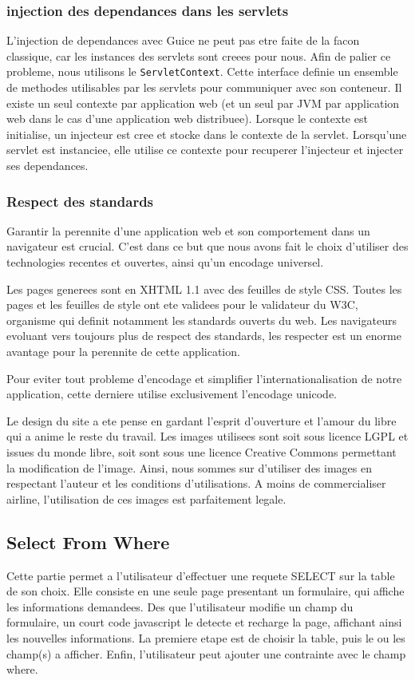 \subsubsection{injection des dependances dans les servlets}
L'injection de dependances avec Guice ne peut pas etre faite de la facon classique, car les instances des servlets sont creees pour nous. Afin de palier ce probleme, nous utilisons le \verb|ServletContext|. Cette  interface definie un ensemble de methodes utilisables par les servlets pour communiquer avec son conteneur. Il existe un seul contexte par application web (et un seul par JVM par application web dans le cas d'une application web distribuee). Lorsque le contexte est initialise, un injecteur est cree et stocke dans le contexte de la servlet. Lorsqu'une servlet est instanciee, elle utilise ce contexte pour recuperer l'injecteur et injecter ses dependances.

\subsubsection{Respect des standards}
Garantir la perennite d'une application web et son comportement dans un navigateur est crucial. C'est dans ce but que nous avons fait le choix d'utiliser des technologies recentes et ouvertes, ainsi qu'un encodage universel.

Les pages generees sont en XHTML 1.1 avec des feuilles de style CSS. Toutes les pages et les feuilles de style ont ete validees pour le validateur du W3C, organisme qui definit notamment les standards ouverts du web. Les navigateurs evoluant vers toujours plus de respect des standards, les respecter est un enorme avantage pour la perennite de cette application.

Pour eviter tout probleme d'encodage et simplifier l'internationalisation de notre application, cette derniere utilise exclusivement l'encodage unicode.

Le design du site a ete pense en gardant l'esprit d'ouverture et l'amour du libre qui a anime le reste du travail. Les images utilisees sont soit sous licence LGPL et issues du monde libre, soit sont sous une licence Creative Commons permettant la modification de l'image. Ainsi, nous sommes sur d'utiliser des images en respectant l'auteur et les conditions d'utilisations. A moins de commercialiser airline, l'utilisation de ces images est parfaitement legale.

\subsection{Select From Where}
Cette partie permet a l'utilisateur d'effectuer une requete SELECT sur la table de son choix. Elle consiste en une seule page presentant un formulaire, qui affiche les informations demandees. Des que l'utilisateur modifie un champ du formulaire, un court code javascript le detecte et recharge la page, affichant ainsi les nouvelles informations. La premiere etape est de choisir la table, puis le ou les champ(s) a afficher. Enfin, l'utilisateur peut ajouter une contrainte avec le champ where.

